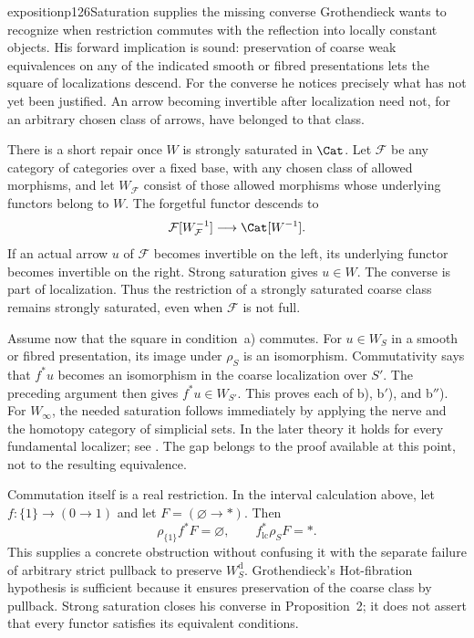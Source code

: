 \begin{dcomment}{exposition}{p126}{Saturation supplies the missing converse}
Grothendieck wants to recognize when restriction commutes with the reflection into locally constant objects. His forward implication is sound: preservation of coarse weak equivalences on any of the indicated smooth or fibred presentations lets the square of localizations descend. For the converse he notices precisely what has not yet been justified. An arrow becoming invertible after localization need not, for an arbitrary chosen class of arrows, have belonged to that class.

There is a short repair once $W$ is strongly saturated in $\Cat$. Let $\mathcal F$ be any category of categories over a fixed base, with any chosen class of allowed morphisms, and let $W_{\mathcal F}$ consist of those allowed morphisms whose underlying functors belong to $W$. The forgetful functor descends to
\[
 \mathcal F[W_{\mathcal F}^{-1}]\longrightarrow\Cat[W^{-1}].
\]
If an actual arrow $u$ of $\mathcal F$ becomes invertible on the left, its underlying functor becomes invertible on the right. Strong saturation gives $u\in W$. The converse is part of localization. Thus the restriction of a strongly saturated coarse class remains strongly saturated, even when $\mathcal F$ is not full.

Assume now that the square in condition~a) commutes. For $u\in W_S$ in a smooth or fibred presentation, its image under $\rho_S$ is an isomorphism. Commutativity says that $f^*u$ becomes an isomorphism in the coarse localization over $S'$. The preceding argument then gives $f^*u\in W_{S'}$. This proves each of b), b$'$), and b$''$). For $W_\infty$, the needed saturation follows immediately by applying the nerve and the homotopy category of simplicial sets. In the later theory it holds for every fundamental localizer; see \citet[Proposition~4.2.4 in the author PDF]{Cisinski2006Presheaves}. The gap belongs to the proof available at this point, not to the resulting equivalence.

Commutation itself is a real restriction. In the interval calculation above, let $f:\{1\}\to(0\to1)$ and let $F=(\varnothing\to*)$. Then
\[
\rho_{\{1\}}f^*F=\varnothing,
 \qquad f^*_{\mathrm{lc}}\rho_S F=*.
\]
This supplies a concrete obstruction without confusing it with the separate failure of arbitrary strict pullback to preserve $W_S^{\mathrm d}$. Grothendieck's Hot-fibration hypothesis is sufficient because it ensures preservation of the coarse class by pullback. Strong saturation closes his converse in Proposition~2; it does not assert that every functor satisfies its equivalent conditions.
\end{dcomment}

